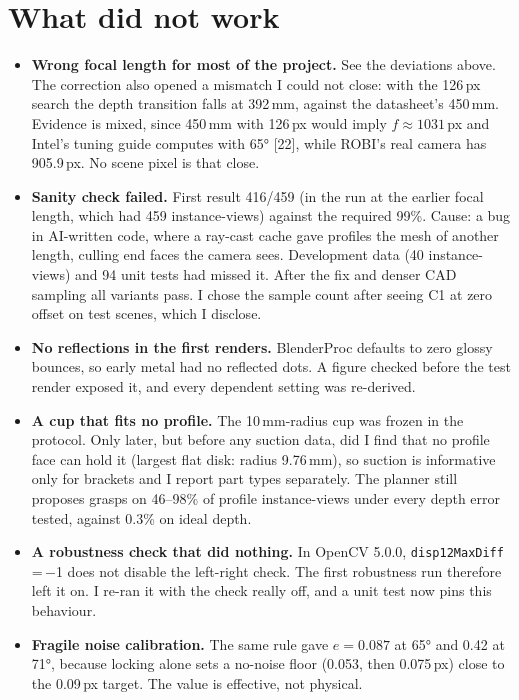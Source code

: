 \documentclass[10pt,a4paper]{article}
\newcommand{\cte}[1]{[#1]}
\begin{document}
\section{What did not work}\label{sec:fail}
\begin{itemize}
\item \textbf{Wrong focal length for most of the project.} See the deviations above. The correction also opened a mismatch I could not close: with the 126\,px search the depth transition falls at 392\,mm, against the datasheet's 450\,mm. Evidence is mixed, since 450\,mm with 126\,px would imply $f\approx1031$\,px and Intel's tuning guide computes with 65° \cte{22}, while ROBI's real camera has 905.9\,px. No scene pixel is that close.
\item \textbf{Sanity check failed.} First result 416/459 (in the run at the earlier focal length, which had 459 instance-views) against the required 99\%. Cause: a bug in AI-written code, where a ray-cast cache gave profiles the mesh of another length, culling end faces the camera sees. Development data (40 instance-views) and 94 unit tests had missed it. After the fix and denser CAD sampling all variants pass. I chose the sample count after seeing C1 at zero offset on test scenes, which I disclose.
\item \textbf{No reflections in the first renders.} BlenderProc defaults to zero glossy bounces, so early metal had no reflected dots. A figure checked before the test render exposed it, and every dependent setting was re-derived.
\item \textbf{A cup that fits no profile.} The 10\,mm-radius cup was frozen in the protocol. Only later, but before any suction data, did I find that no profile face can hold it (largest flat disk: radius 9.76\,mm), so suction is informative only for brackets and I report part types separately. The planner still proposes grasps on 46--98\% of profile instance-views under every depth error tested, against 0.3\% on ideal depth.
\item \textbf{A robustness check that did nothing.} In OpenCV 5.0.0, \texttt{disp12MaxDiff}\,=\,$-$1 does not disable the left-right check. The first robustness run therefore left it on. I re-ran it with the check really off, and a unit test now pins this behaviour.
\item \textbf{Fragile noise calibration.} The same rule gave $e=0.087$ at 65° and 0.42 at 71°, because locking alone sets a no-noise floor (0.053, then 0.075\,px) close to the 0.09\,px target. The value is effective, not physical.

\end{itemize}
\end{document}
